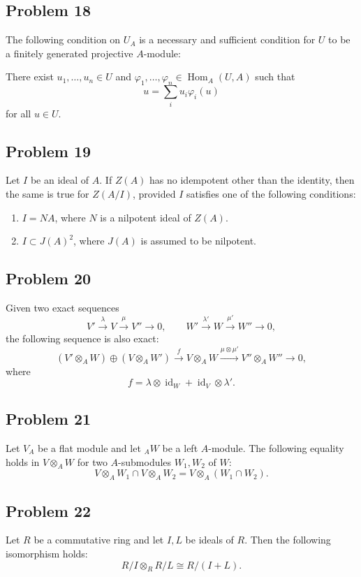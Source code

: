 \subsection{Problem 18}

The following condition on \(U_A\) is a necessary and sufficient condition for
\(U\) to be a finitely generated projective \(A\)-module:

There exist \(u_1,\ldots,u_n\in U\) and
\(\varphi_1,\ldots,\varphi_n\in \operatorname{Hom}_A(U,A)\) such that
\[
u=\sum_i u_i\varphi_i(u)
\]
for all \(u\in U\).

\subsection{Problem 19}

Let \(I\) be an ideal of \(A\). If \(Z(A)\) has no idempotent other than the
identity, then the same is true for \(Z(A/I)\), provided \(I\) satisfies one of
the following conditions:

\begin{enumerate}
    \item[(1)] \(I=NA\), where \(N\) is a nilpotent ideal of \(Z(A)\).
    \item[(2)] \(I\subset J(A)^2\), where \(J(A)\) is assumed to be nilpotent.
\end{enumerate}

\subsection{Problem 20}

Given two exact sequences
\[
V'\xrightarrow{\lambda} V\xrightarrow{\mu} V''\to 0,
\qquad
W'\xrightarrow{\lambda'} W\xrightarrow{\mu'} W''\to 0,
\]
the following sequence is also exact:
\[
(V'\otimes_A W)\oplus (V\otimes_A W')
\xrightarrow{f}
V\otimes_A W
\xrightarrow{\mu\otimes \mu'}
V''\otimes_A W''
\to 0,
\]
where
\[
f=\lambda\otimes \operatorname{id}_W+\operatorname{id}_V\otimes \lambda'.
\]

\subsection{Problem 21}

Let \(V_A\) be a flat module and let \({}_A W\) be a left \(A\)-module. The
following equality holds in \(V\otimes_A W\) for two \(A\)-submodules
\(W_1,W_2\) of \(W\):
\[
V\otimes_A W_1\cap V\otimes_A W_2
=
V\otimes_A (W_1\cap W_2).
\]

\subsection{Problem 22}

Let \(R\) be a commutative ring and let \(I,L\) be ideals of \(R\). Then the
following isomorphism holds:
\[
R/I\otimes_R R/L
\cong
R/(I+L).
\]